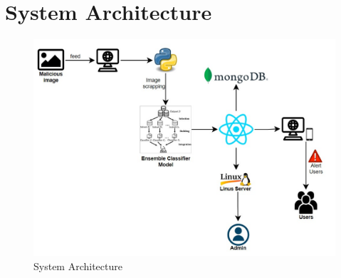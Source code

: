 \section{System Architecture}
\begin{figure}[H]
    \includegraphics[width=180mm]{./img/System architecture.jpg}
    \caption{System Architecture}
\end{figure}
\clearpage 
